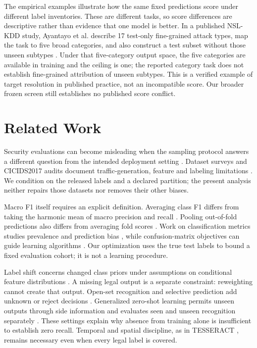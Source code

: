 \documentclass[namedate,webpdf,contemporary,large]{TBench-template}
\begin{document}
The empirical examples illustrate how the same fixed predictions score under different label inventories. These are different tasks, so score differences are descriptive rather than evidence that one model is better. In a published NSL-KDD study, Ayantayo et al. describe 17 test-only fine-grained attack types, map the task to five broad categories, and also construct a test subset without those unseen subtypes \cite{ayantayo2023}. Under that five-category output space, the five categories are available in training and the ceiling is one; the reported category task does not establish fine-grained attribution of unseen subtypes. This is a verified example of target resolution in published practice, not an incompatible score. Our broader frozen screen still establishes no published score conflict.

\section{Related Work}
Security evaluations can become misleading when the sampling protocol answers a different question from the intended deployment setting \cite{sommer2010,arp2022}. Dataset surveys and CICIDS2017 audits document traffic-generation, feature and labeling limitations \cite{ring2019,engelen2021,lanvin2023}. We condition on the released labels and a declared partition; the present analysis neither repairs those datasets nor removes their other biases.

Macro F1 itself requires an explicit definition. Averaging class F1 differs from taking the harmonic mean of macro precision and recall \cite{opitzburst2019}. Pooling out-of-fold predictions also differs from averaging fold scores \cite{forman2010}. Work on classification metrics studies prevalence and prediction bias \cite{opitz2024,sokolova2009}, while confusion-matrix objectives can guide learning algorithms \cite{narasimhan2015}. Our optimization uses the true test labels to bound a fixed evaluation cohort; it is not a learning procedure.

Label shift concerns changed class priors under assumptions on conditional feature distributions \cite{lipton2018}. A missing legal output is a separate constraint: reweighting cannot create that output. Open-set recognition and selective prediction add unknown or reject decisions \cite{scheirer2013,geng2021,chow1970,geifman2019}. Generalized zero-shot learning permits unseen outputs through side information and evaluates seen and unseen recognition separately \cite{xian2017}. These settings explain why absence from training alone is insufficient to establish zero recall. Temporal and spatial discipline, as in TESSERACT \cite{pendlebury2019}, remains necessary even when every legal label is covered.
\end{document}
